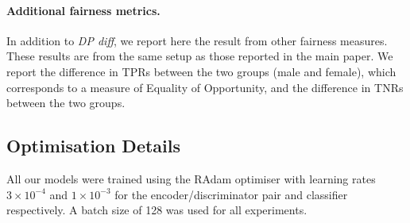 \begin{table}[tbp]
    \caption{
        Additional fairness metrics for the experiments on the CelebA dataset (fig.~\ref{fig:celeba-multiplot} from the main text).
        \emph{TPR diff.}\ refers to the difference in true positive rate.
        \emph{TNR diff.}\ refers to the difference in true negative rate.
        \textsc{Left:} $\eta = 0$. \textsc{Right:} $\eta=1$.
    }
    \label{tab:my_label}
\hfill
{}
\end{table}
\paragraph{Additional fairness metrics.}
In addition to \emph{DP diff}, we report here the result from other fairness measures.
These results are from the same setup as those reported in the main paper.
We report the difference in \acp{TPR} between the two groups (male and female), which corresponds to a measure of Equality of Opportunity,
and the difference in \acp{TNR} between the two groups.

\subsection{Optimisation Details}\label{sec:optimisation-details}
\noindent All our models were trained using the RAdam optimiser \citep{liu2019variance} with learning rates $3\times10^{-4}$ and $1\times10^{-3}$ for the encoder/discriminator pair and classifier respectively. A batch size of 128 was used for all experiments.

